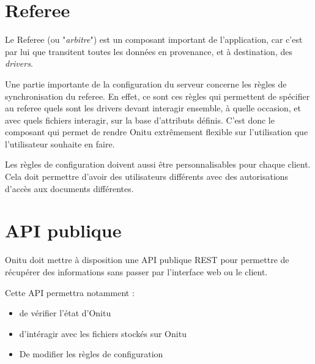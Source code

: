 \section{Referee}

Le Referee (ou "\emph{arbitre}") est un composant important de l'application, car c'est par lui que transitent toutes les données en provenance, et à destination, des \emph{drivers}.

Une partie importante de la configuration du serveur concerne les règles de synchronisation du referee. En effet, ce sont ces règles qui permettent de spécifier au referee quels sont les drivers devant interagir ensemble, à quelle occasion, et avec quels fichiers interagir, sur la base d'attributs définis. C'est donc le composant qui permet de rendre Onitu extrêmement flexible sur l'utilisation que l'utilisateur souhaite en faire.

Les règles de configuration doivent aussi être personnalisables pour chaque
client. Cela doit permettre d'avoir des utilisateurs différents avec des
autorisations d'accès aux documents différentes.


\section{API publique}

Onitu doit mettre à disposition une API publique REST pour permettre de récupérer des
informations sans passer par l'interface web ou le client.

Cette API permettra notamment :
\begin{itemize}
\renewcommand{\labelitemi}{$\bullet$}
	\item de vérifier l'état d'Onitu
	\item d'intéragir avec les fichiers stockés sur Onitu
  \item De modifier les règles de configuration
\end{itemize}
